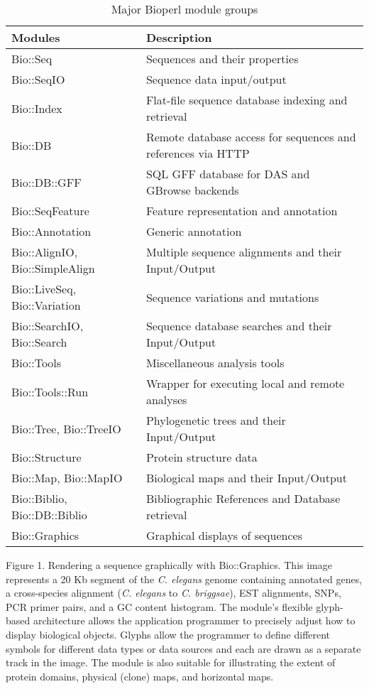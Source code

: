 \documentclass[12pt]{article}
\begin{document}
\pagestyle{fancy}
\fancyhf{}
\renewcommand{\headrulewidth}{0pt}


\begin{table}[h]
\begin{tabular}{|l|l|}
\hline
\textbf{Modules} & \textbf{Description} \\
\hline
Bio::Seq &  Sequences and their properties \\
Bio::SeqIO & Sequence data input/output \\
Bio::Index & Flat-file sequence database indexing and retrieval \\ 
Bio::DB & Remote database access for sequences and references via HTTP \\
Bio::DB::GFF & SQL GFF database for DAS and GBrowse backends \\
Bio::SeqFeature & Feature representation and annotation \\
Bio::Annotation & Generic annotation \\
Bio::AlignIO, Bio::SimpleAlign   & Multiple sequence alignments and their Input/Output \\
Bio::LiveSeq, Bio::Variation & Sequence variations and mutations \\
Bio::SearchIO, Bio::Search  & Sequence database searches and their Input/Output \\
Bio::Tools &  Miscellaneous analysis tools \\
Bio::Tools::Run &  Wrapper for executing local and remote analyses \\
Bio::Tree, Bio::TreeIO & Phylogenetic trees and their Input/Output  \\
Bio::Structure & Protein structure data \\
Bio::Map, Bio::MapIO & Biological maps and their Input/Output \\
Bio::Biblio, Bio::DB::Biblio & Bibliographic References and Database
retrieval \\ 
Bio::Graphics & Graphical displays of sequences \\
\hline
\end{tabular}
\caption{Major Bioperl module groups}
\label{tab:modules}
\end{table}

\newpage


Figure 1.  Rendering a sequence graphically with Bio::Graphics.  This
image represents a 20 Kb segment of the \textit{C. elegans} genome
containing annotated genes, a cross-species alignment
(\textit{C. elegans} to \textit{C. briggsae}), EST alignments, SNPs,
PCR primer pairs, and a GC content histogram.  The module's flexible
glyph-based architecture allows the application programmer to
precisely adjust how to display biological objects.  Glyphs allow the
programmer to define different symbols for different data types or
data sources and each are drawn as a separate track in the image.  The
module is also suitable for illustrating the extent of protein
domains, physical (clone) maps, and horizontal maps.
\end{document}
